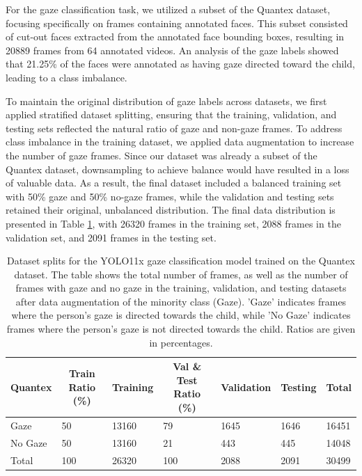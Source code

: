 \documentclass[
  man,floatsintext]{apa6}
\begin{document}
For the gaze classification task, we utilized a subset of the Quantex dataset, focusing specifically on frames containing annotated faces. This subset consisted of cut-out faces extracted from the annotated face bounding boxes, resulting in 20889 frames from 64 annotated videos. An analysis of the gaze labels showed that 21.25\% of the faces were annotated as having gaze directed toward the child, leading to a class imbalance.

To maintain the original distribution of gaze labels across datasets, we first applied stratified dataset splitting, ensuring that the training, validation, and testing sets reflected the natural ratio of gaze and non-gaze frames. To address class imbalance in the training dataset, we applied data augmentation to increase the number of gaze frames. Since our dataset was already a subset of the Quantex dataset, downsampling to achieve balance would have resulted in a loss of valuable data. As a result, the final dataset included a balanced training set with 50\% gaze and 50\% no-gaze frames, while the validation and testing sets retained their original, unbalanced distribution. The final data distribution is presented in Table \ref{tab:gaze-dataset-splits}, with 26320 frames in the training set, 2088 frames in the validation set, and 2091 frames in the testing set.

\begin{table}[tbp]

\begin{center}
\begin{threeparttable}

\caption{\label{tab:gaze-dataset-splits}Dataset splits for the YOLO11x gaze classification model trained on the Quantex dataset. The table shows the total number of frames, as well as the number of frames with gaze and no gaze in the training, validation, and testing datasets after data augmentation of the minority class (Gaze). 'Gaze' indicates frames where the person's gaze is directed towards the child, while 'No Gaze' indicates frames where the person's gaze is not directed towards the child. Ratios are given in percentages.}

\begin{tabular}{lllllll}
\toprule
Quantex & \multicolumn{1}{c}{Train Ratio (\%)} & \multicolumn{1}{c}{Training} & \multicolumn{1}{c}{Val \& Test Ratio (\%)} & \multicolumn{1}{c}{Validation} & \multicolumn{1}{c}{Testing} & \multicolumn{1}{c}{Total}\\
\midrule
Gaze & 50 & 13160 & 79 & 1645 & 1646 & 16451\\
No Gaze & 50 & 13160 & 21 & 443 & 445 & 14048\\
Total & 100 & 26320 & 100 & 2088 & 2091 & 30499\\
\bottomrule
\end{tabular}

\end{threeparttable}
\end{center}

\end{table}
\end{document}
